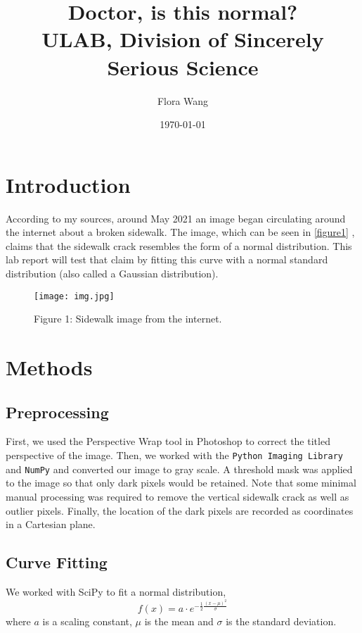 \documentclass{article}
\title{Doctor, is this normal?\\\large{ULAB, Division of Sincerely Serious Science}}
\author{Flora Wang}
\date{\today}
\begin{document}
\maketitle

\section{Introduction}

According to my sources, around May 2021 an image began circulating around the internet about a broken sidewalk. The image, which can be seen in \autoref{figure1} , claims that the sidewalk crack resembles the form of a normal distribution. This lab report will test that claim by fitting this curve with a normal standard distribution (also called a Gaussian distribution).

\begin{figure}[h]
    \texttt{[image: img.jpg]}
    \centering
    \caption{Figure 1: Sidewalk image from the internet.}
    \label{figure1}
\end{figure}


\section{Methods}

\subsection{Preprocessing}
First, we used the Perspective Wrap tool in Photoshop to correct the titled perspective of the image. Then,
we worked with the \texttt{Python Imaging Library} and \texttt{NumPy} \cite{2020NumPy-Array} and converted our image to gray scale.
A threshold mask was applied to the image so that only dark pixels would be retained. Note that some
minimal manual processing was required to remove the vertical sidewalk crack as well as outlier pixels.
Finally, the location of the dark pixels are recorded as coordinates in a Cartesian plane.

\subsection{Curve Fitting}
We worked with SciPy \cite{2020SciPy-NMeth}
 to fit a normal distribution,
\begin{equation}
f(x) = a \cdot e^{-\frac{1}{2}\frac{(x-\mu)^2}{\sigma}}
\end{equation}
where \( a \) is a scaling constant,  $\mu$ is the mean and $\sigma$ is the standard deviation.
\end{document}
